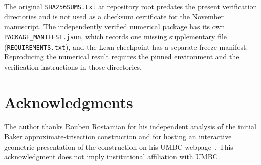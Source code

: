 \documentclass[12pt]{article}
\theoremstyle{definition}
\theoremstyle{remark}
\begin{document}
The original \texttt{SHA256SUMS.txt} at repository root predates the present
verification directories and is not used as a checksum certificate for the
November manuscript. The independently verified numerical package has its own
\texttt{PACKAGE\_MANIFEST.json}, which records one missing supplementary file
(\texttt{REQUIREMENTS.txt}), and the Lean checkpoint has a separate freeze
manifest. Reproducing the numerical result requires the pinned environment and
the verification instructions in those directories.

\section*{Acknowledgments}

The author thanks Rouben Rostamian for his independent analysis of the initial
Baker approximate-trisection construction and for hosting an interactive
geometric presentation of the construction on his UMBC webpage~\cite{rostamian}.  This
acknowledgment does not imply institutional affiliation with UMBC.
\end{document}
